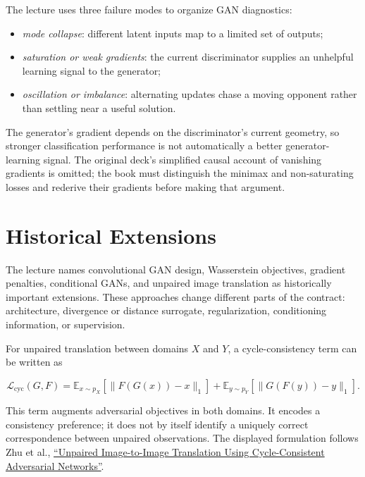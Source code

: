 \documentclass{article}
\begin{document}
The lecture uses three failure modes to organize GAN diagnostics:

\begin{itemize}
\item \emph{mode collapse}: different latent inputs map to a limited set of outputs;
\item \emph{saturation or weak gradients}: the current discriminator supplies an
unhelpful learning signal to the generator;
\item \emph{oscillation or imbalance}: alternating updates chase a moving opponent
rather than settling near a useful solution.
\end{itemize}

The generator's gradient depends on the discriminator's current geometry, so stronger
classification performance is not automatically a better generator-learning signal.
The original deck's simplified causal account of vanishing gradients is omitted; the
book must distinguish the minimax and non-saturating losses and rederive their gradients
before making that argument.


\section{Historical Extensions}

The lecture names convolutional GAN design, Wasserstein objectives, gradient penalties,
conditional GANs, and unpaired image translation as historically important extensions.
These approaches change different parts of the contract: architecture, divergence or
distance surrogate, regularization, conditioning information, or supervision.

For unpaired translation between domains $X$ and $Y$, a cycle-consistency term can be
written as

\[
\mathcal{L}_{\mathrm{cyc}}(G,F)
=\mathbb{E}_{x\sim p_X}
[\|F(G(x))-x\|_1]
+\mathbb{E}_{y\sim p_Y}
[\|G(F(y))-y\|_1].
\]

This term augments adversarial objectives in both domains. It encodes a consistency
preference; it does not by itself identify a uniquely correct correspondence between
unpaired observations. The displayed formulation follows Zhu et al.,
\href{https://openaccess.thecvf.com/content_iccv_2017/html/Zhu_Unpaired_Image-To-Image_Translation_ICCV_2017_paper.html}
{``Unpaired Image-to-Image Translation Using Cycle-Consistent Adversarial
Networks''}.
\end{document}
